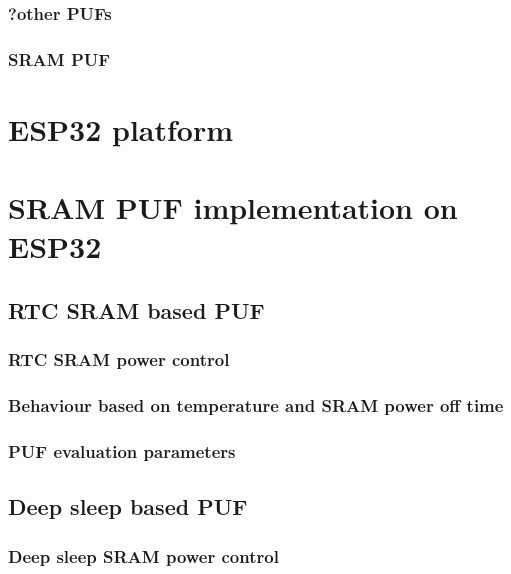\subsection{?other PUFs}
\subsection{SRAM PUF}

\chapter{ESP32 platform}

\chapter{SRAM PUF implementation on ESP32}

\section{RTC SRAM based PUF}

\subsection{RTC SRAM power control}
\subsection{Behaviour based on temperature and SRAM power off time}
\subsection{PUF evaluation parameters}

\section{Deep sleep based PUF}

\subsection{Deep sleep SRAM power control}
